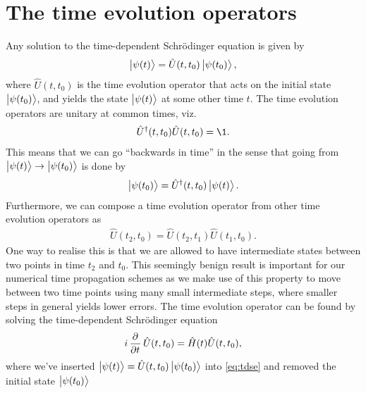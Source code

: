     \section{The time evolution operators}
        Any solution to the time-dependent Schrödinger equation is given by
        \begin{align}
            \ket{\psi(t)} = \hat{U}(t, t_0)\ket{\psi(t_0)},
        \end{align}
        where $\hat{U}(t, t_0)$ is the time evolution operator that acts on the
        initial state $\ket{\psi(t_0)}$, and yields the state $\ket{\psi(t)}$ at
        some other time $t$.
        The time evolution operators are unitary at common times, viz.
        \begin{align}
            \hat{U}^{\dagger}(t, t_0)\hat{U}(t, t_0) = \1.
        \end{align}
        This means that we can go ``backwards in time'' in the sense that going
        from $\ket{\psi(t)} \to \ket{\psi(t_0)}$ is done by
        \begin{align}
            \ket{\psi(t_0)} = \hat{U}^{\dagger}(t, t_0)\ket{\psi(t)}.
        \end{align}
        Furthermore, we can compose a time evolution operator from other time
        evolution operators as
        \begin{align}
            \hat{U}(t_2, t_0) = \hat{U}(t_2, t_1)\hat{U}(t_1, t_0).
        \end{align}
        One way to realise this is that we are allowed to have intermediate
        states between two points in time $t_2$ and $t_0$.
        This seemingly benign result is important for our numerical time
        propagation schemes as we make use of this property to move between
        two time points using many small intermediate steps, where smaller steps
        in general yields lower errors.
        The time evolution operator can be found by solving the time-dependent
        Schrödinger equation
        \begin{gather}
            i\dpd{}{t}\hat{U}(t, t_0) = \hamil(t)\hat{U}(t, t_0),
        \end{gather}
        where we've inserted $\ket{\psi(t)} = \hat{U}(t, t_0)\ket{\psi(t_0)}$
        into \autoref{eq:tdse} and removed the initial state $\ket{\psi(t_0)}$
